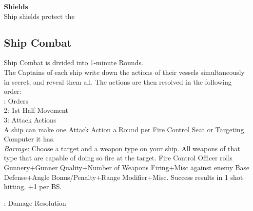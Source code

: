 \documentclass[a4paper, twocolumn, openany]{book}
\newlength{\indentlen}
\newcommand{\tabto}[1]{\setlength{\leftskip}{#1\indentlen}}
\begin{document}
{{\bfseries Shields\\}
Ship shields protect the\\

\subsection{Ship Combat}
Ship Combat is divided into 1-minute Rounds.\\
The Captains of each ship write down the actions of their vessels simultaneously in secret, and
reveal them all. The actions are then resolved in the following order:\\

: Orders\\
2: 1st Half Movement\\
3: Attack Actions\\
A ship can make one Attack Action a Round per Fire Control Seat or Targeting Computer it has.\\

\tabto{1}
{\slshape Barrage}: Choose a target and a weapon type on your ship. All weapons of that type that
are capable of doing so fire at the target. Fire Control Officer rolls Gunnery+Gunner
Quality+Number of Weapons Firing+Misc against enemy Base Defense+Angle
Bonus/Penalty+Range Modifier+Misc. Success results in 1 shot hitting, +1 per BS.\\


\tabto{0}

: Damage Resolution\\

}
\end{document}
